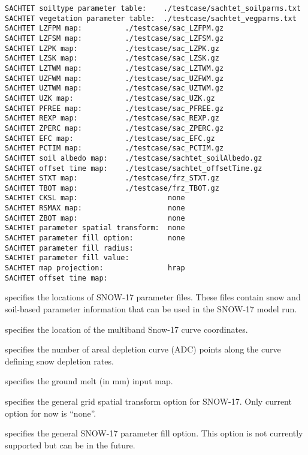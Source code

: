  \begin{Verbatim}[frame=single]
SACHTET soiltype parameter table:    ./testcase/sachtet_soilparms.txt
SACHTET vegetation parameter table:  ./testcase/sachtet_vegparms.txt
SACHTET LZFPM map:          ./testcase/sac_LZFPM.gz
SACHTET LZFSM map:          ./testcase/sac_LZFSM.gz
SACHTET LZPK map:           ./testcase/sac_LZPK.gz
SACHTET LZSK map:           ./testcase/sac_LZSK.gz
SACHTET LZTWM map:          ./testcase/sac_LZTWM.gz
SACHTET UZFWM map:          ./testcase/sac_UZFWM.gz
SACHTET UZTWM map:          ./testcase/sac_UZTWM.gz
SACHTET UZK map:            ./testcase/sac_UZK.gz
SACHTET PFREE map:          ./testcase/sac_PFREE.gz
SACHTET REXP map:           ./testcase/sac_REXP.gz
SACHTET ZPERC map:          ./testcase/sac_ZPERC.gz
SACHTET EFC map:            ./testcase/sac_EFC.gz
SACHTET PCTIM map:          ./testcase/sac_PCTIM.gz
SACHTET soil albedo map:    ./testcase/sachtet_soilAlbedo.gz
SACHTET offset time map:    ./testcase/sachtet_offsetTime.gz
SACHTET STXT map:           ./testcase/frz_STXT.gz
SACHTET TBOT map:           ./testcase/frz_TBOT.gz
SACHTET CKSL map:                     none
SACHTET RSMAX map:                    none
SACHTET ZBOT map:                     none
SACHTET parameter spatial transform:  none
SACHTET parameter fill option:        none
SACHTET parameter fill radius:
SACHTET parameter fill value:
SACHTET map projection:               hrap
SACHTET offset time map:
 \end{Verbatim}

 
  specifies the locations of SNOW-17 
 parameter files.  These files contain snow and soil-based
 parameter information that can be used in the SNOW-17 model run.

  specifies the location of the
 multiband Snow-17 curve coordinates.

  specifies the number
  of areal depletion curve (ADC) points along the curve defining snow depletion
  rates.

  specifies the ground melt (in mm) input map.

  specifies the general grid spatial
  transform option for SNOW-17.  Only current option for now is ``none''.

  specifies the general SNOW-17
 parameter fill option.  This option is not currently supported
 but can be in the future.

